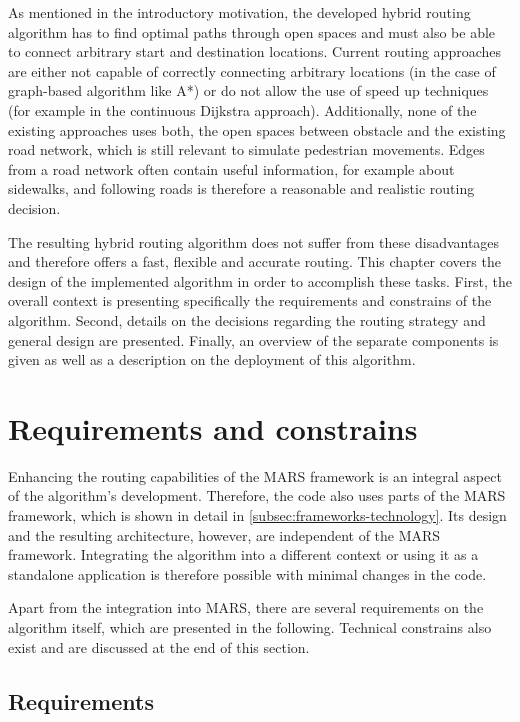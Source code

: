 
As mentioned in the introductory motivation, the developed hybrid routing algorithm has to find optimal paths through open spaces and must also be able to connect arbitrary start and destination locations.
Current routing approaches are either not capable of correctly connecting arbitrary locations (in the case of graph-based algorithm like A*) or do not allow the use of speed up techniques (for example in the continuous Dijkstra approach).
Additionally, none of the existing approaches uses both, the open spaces between obstacle and the existing road network, which is still relevant to simulate pedestrian movements.
Edges from a road network often contain useful information, for example about sidewalks, and following roads is therefore a reasonable and realistic routing decision.

The resulting hybrid routing algorithm does not suffer from these disadvantages and therefore offers a fast, flexible and accurate routing.
This chapter covers the design of the implemented algorithm in order to accomplish these tasks.
First, the overall context is presenting specifically the requirements and constrains of the algorithm.
Second, details on the decisions regarding the routing strategy and general design are presented.
Finally, an overview of the separate components is given as well as a description on the deployment of this algorithm.

\section{Requirements and constrains}
	
	Enhancing the routing capabilities of the MARS framework is an integral aspect of the algorithm's development.
	Therefore, the code also uses parts of the MARS framework, which is shown in detail in \cref{subsec:frameworks-technology}.
	Its design and the resulting architecture, however, are independent of the MARS framework.
	Integrating the algorithm into a different context or using it as a standalone application is therefore possible with minimal changes in the code.
	
	Apart from the integration into MARS, there are several requirements on the algorithm itself, which are presented in the following.
	Technical constrains also exist and are discussed at the end of this section.
	
	\subsection{Requirements}
	
